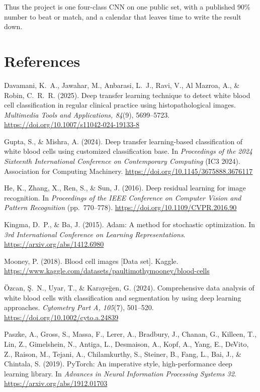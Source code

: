 \documentclass[11pt]{article}
\begin{document}
Thus the project is one four-class CNN on one public set, with a published 90\% number to beat or match, and a calendar that leaves time to write the result down.

\section*{References}

Davamani, K.~A., Jawahar, M., Anbarasi, L.~J., Ravi, V., Al Mazroa, A., \& Robin, C.~R.~R. (2025). Deep transfer learning technique to detect white blood cell classification in regular clinical practice using histopathological images. \textit{Multimedia Tools and Applications, 84}(9), 5699--5723. \url{https://doi.org/10.1007/s11042-024-19133-8}

Gupta, S., \& Mishra, A. (2024). Deep transfer learning-based classification of white blood cells using customized classification base. In \textit{Proceedings of the 2024 Sixteenth International Conference on Contemporary Computing} (IC3 2024). Association for Computing Machinery. \url{https://doi.org/10.1145/3675888.3676117}

He, K., Zhang, X., Ren, S., \& Sun, J. (2016). Deep residual learning for image recognition. In \textit{Proceedings of the IEEE Conference on Computer Vision and Pattern Recognition} (pp.\ 770--778). \url{https://doi.org/10.1109/CVPR.2016.90}

Kingma, D.~P., \& Ba, J. (2015). Adam: A method for stochastic optimization. In \textit{3rd International Conference on Learning Representations}. \url{https://arxiv.org/abs/1412.6980}

Mooney, P. (2018). Blood cell images [Data set]. Kaggle. \url{https://www.kaggle.com/datasets/paultimothymooney/blood-cells}

\"{O}zcan, \c{S}.~N., Uyar, T., \& Karaye\u{g}en, G. (2024). Comprehensive data analysis of white blood cells with classification and segmentation by using deep learning approaches. \textit{Cytometry Part A, 105}(7), 501--520. \url{https://doi.org/10.1002/cyto.a.24839}

Paszke, A., Gross, S., Massa, F., Lerer, A., Bradbury, J., Chanan, G., Killeen, T., Lin, Z., Gimelshein, N., Antiga, L., Desmaison, A., Kopf, A., Yang, E., DeVito, Z., Raison, M., Tejani, A., Chilamkurthy, S., Steiner, B., Fang, L., Bai, J., \& Chintala, S. (2019). PyTorch: An imperative style, high-performance deep learning library. In \textit{Advances in Neural Information Processing Systems 32}. \url{https://arxiv.org/abs/1912.01703}
\end{document}
